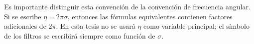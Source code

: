 Es importante distinguir esta convención de la convención de frecuencia angular. Si se escribe $\eta=2\pi\sigma$, entonces las fórmulas equivalentes contienen factores adicionales de $2\pi$. En esta tesis no se usará $\eta$ como variable principal; el símbolo de los filtros se escribirá siempre como función de $\sigma$.
